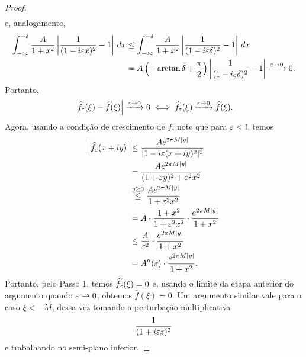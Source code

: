 \begin{proof}
\begin{align*}
            \end{align*}
            e, analogamente,
            \begin{align*}
                \int_{-\infty}^{-\delta} \frac{A}{1+ x^2}\left| \frac{1}{(1-i\varepsilon x)^2} - 1 \right| \, dx
                &\leq \int_{-\infty}^{-\delta} \frac{A}{1+ x^2}\left| \frac{1}{(1-i\varepsilon\delta)^2} - 1 \right| \, dx \\
                &=  A\left( -\arctan\delta + \frac{\pi}{2} \right) \left| \frac{1}{(1-i\varepsilon\delta)^2} - 1 \right| 
                \xrightarrow{\varepsilon\to 0} 0.
            \end{align*}
            Portanto,
            \begin{equation*}
                \left| \widehat{f_{\varepsilon}}(\xi) - \widehat{f}(\xi) \right| \xrightarrow{\varepsilon\to 0} 0 
                \iff \widehat{f_{\varepsilon}}(\xi) \xrightarrow{\varepsilon\to 0} \widehat{f}(\xi).
            \end{equation*}
            Agora, usando a condição de crescimento de $f$, note que
            para $\varepsilon<1$ temos
            \begin{align*}
                \left| \widehat{f_{\varepsilon}}(x+iy) \right| &\leq \frac{Ae^{2\pi M|y|}}{|1 - i\varepsilon (x+iy)^2|^2} \\
                &= \frac{Ae^{2\pi M|y|}}{(1+ \varepsilon y)^2 + \varepsilon^2x^2} \\
                &\stackrel{y\geq 0}{\leq} \frac{Ae^{2\pi M|y|}}{1 + \varepsilon^2x^2} \\
                &= A\cdot\frac{1+x^2}{1 + \varepsilon^2x^2}\cdot\frac{e^{2\pi M|y|}}{1 + x^2} \\
                &\leq \frac{A}{\varepsilon^2}\cdot\frac{e^{2\pi M|y|}}{1 + x^2} \\
                &= A''(\varepsilon)\cdot \frac{e^{2\pi M|y|}}{1 + x^2}.
            \end{align*}
            Portanto, pelo Passo 1, temos $\widehat{f_{\varepsilon}}(\xi) = 0$ e, usando o limite da etapa anterior do argumento quando
            $\varepsilon\to 0$, obtemos $\widehat{f}(\xi) = 0$. Um argumento similar vale para o caso
            $\xi < -M$, dessa vez tomando a perturbação multiplicativa
            \begin{equation*}
                \frac{1}{(1 + i\varepsilon z)^2}
            \end{equation*}
            e trabalhando no semi-plano inferior.

\end{proof}
